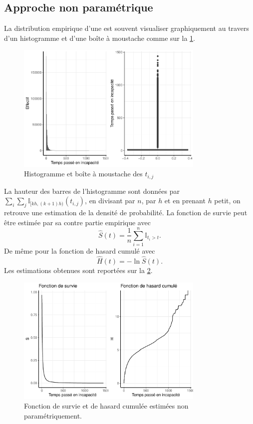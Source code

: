 \subsection{Approche non paramétrique}
La distribution empirique d'une \va est souvent visualiser graphiquement au travers d'un histogramme et d'une boîte à moustache comme sur la \cref{fig:INC_hist_boxplot}.
\begin{figure}[h!]
\centering
\includegraphics[width = 0.8\textwidth]{../figures/INC_hist_boxplot}
\caption{Histogramme et boîte à moustache des $t_{i,j}$}
\label{fig:INC_hist_boxplot}
\end{figure}
La hauteur des barres de l'histogramme sont données par $\sum_i \sum_j \mathbb{I}_{[kh,(k+1)h)}(t_{i,j})$, en divisant par $n$, par $h$ et en prenant $h$ petit, on retrouve une estimation de la densité de probabilité. La fonction de survie peut être estimée par sa contre partie empirique avec 
\begin{equation}\label{eq:fonction_survie_estim_nonp}
\widehat{S}(t) = \frac{1}{n}\sum_{i=1}^n\mathbb{I}_{t_{i} > t}.
\end{equation}
De même pour la fonction de hasard cumulé avec
$$
\widehat{H}(t) = -\ln \widehat{S}(t).
$$
Les estimations obtenues sont reportées sur la \cref{fig:INC_S_H_nonp}.
\begin{figure}[h!]
\centering
\includegraphics[width = 0.8\textwidth]{../figures/INC_S_H_nonp}
\caption{Fonction de survie et de hasard cumulée estimées non paramétriquement.}
\label{fig:INC_S_H_nonp}
\end{figure}
